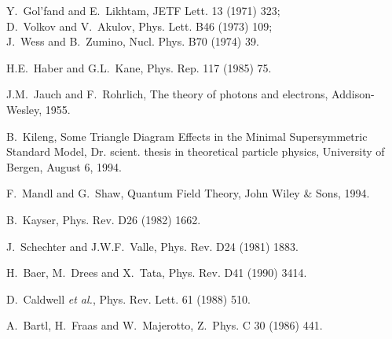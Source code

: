 \begin{thebibliography}{10}

Y.~Gol'fand and E.~Likhtam, JETF Lett. 13 (1971) 323;\\
D.~Volkov and V.~Akulov, Phys. Lett. B46 (1973) 109;\\
J.~Wess and B.~Zumino, Nucl. Phys. B70 (1974) 39.

H.E.~Haber and G.L.~Kane, Phys. Rep. 117 (1985) 75.

J.M.~Jauch and F.~Rohrlich, The theory of photons and electrons,
Addison-Wesley, 1955.

B.~Kileng, 
Some Triangle Diagram Effects in the Minimal Supersymmetric Standard 
Model, 
Dr. scient. thesis in theoretical particle physics,
University of Bergen, August 6, 1994.


F.~Mandl and G.~Shaw, Quantum Field Theory, John Wiley \& Sons, 1994.

B.~Kayser, Phys. Rev. D26 (1982) 1662.

J.~Schechter and J.W.F.~Valle, Phys. Rev. D24 (1981) 1883.

H.~Baer, M.~Drees and X.~Tata, Phys. Rev. D41 (1990) 3414.

D.~Caldwell {\it et al.}, Phys. Rev. Lett. 61 (1988) 510.

A.~Bartl, H.~Fraas and W.~Majerotto, Z.~Phys. C 30 (1986) 441.

\end{thebibliography}
